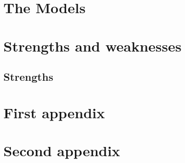\documentclass{mcmthesis}
\begin{document}
\section{The Models}

\section{Strengths and weaknesses}

\subsection{Strengths}


\medskip



\begin{appendices}

\section{First appendix}

\section{Second appendix}

% 

\end{appendices}
\end{document}

